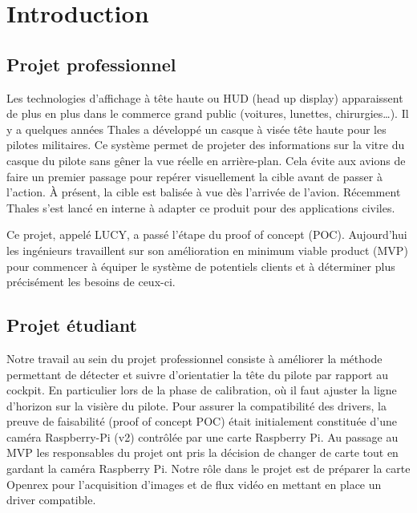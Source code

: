 
\chapter{Introduction} %

\label{Chapter1} %


\section{Projet professionnel}

Les technologies d’affichage à tête haute ou HUD (head up display) apparaissent de plus en plus dans le
commerce grand public (voitures, lunettes, chirurgies…). Il y a quelques années Thales a développé un
casque à visée tête haute pour les pilotes militaires. Ce système permet de projeter des informations
sur la vitre du casque du pilote sans gêner la vue réelle en arrière-plan. Cela évite aux avions de 
faire un premier passage pour repérer visuellement la cible avant de passer à l’action. À présent, la
cible est balisée à vue dès l’arrivée de l’avion. Récemment Thales s’est lancé en interne à adapter 
ce produit pour des applications civiles. \medskip

Ce projet, appelé LUCY, a passé l’étape du proof of concept (POC). Aujourd’hui les ingénieurs
travaillent sur son amélioration en minimum viable product (MVP) pour commencer à équiper le système
de potentiels clients et à déterminer plus précisément les besoins de ceux-ci. 

\section{Projet étudiant}

Notre travail au sein du projet professionnel consiste à améliorer la méthode permettant de détecter et suivre
d’orientatier la tête du pilote par rapport au cockpit. En particulier lors de la phase de
calibration, où il faut ajuster la ligne d’horizon sur la visière du pilote. Pour assurer la
compatibilité des drivers, la preuve de faisabilité (proof of concept POC) était initialement
constituée d’une caméra Raspberry-Pi (v2) contrôlée par une carte Raspberry Pi. Au passage au MVP
les responsables du projet ont pris la décision de changer de carte tout en gardant la caméra
Raspberry Pi. Notre rôle dans le projet est de préparer la carte Openrex pour l’acquisition d’images
et de flux vidéo en mettant en place un driver compatible. 

